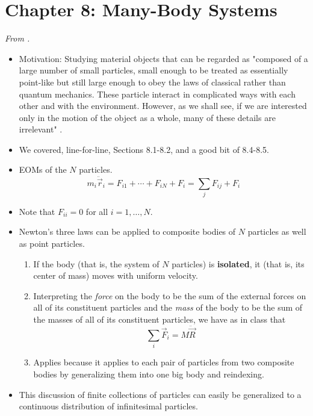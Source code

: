 \documentclass[../notes.tex]{subfiles}
\begin{document}
\section{Chapter 8: Many-Body Systems}
\emph{From \textcite{bib:KibbleBerkshire}.}
\begin{itemize}
    \item {}Motivation: Studying material objects that can be regarded as "composed of a large number of small particles, small enough to be treated as essentially point-like but still large enough to obey the laws of classical rather than quantum mechanics. These particle interact in complicated ways with each other and with the environment. However, as we shall see, if we are interested only in the motion of the object as a whole, many of these details are irrelevant" \parencite[177]{bib:KibbleBerkshire}.
    \item We covered, line-for-line, Sections 8.1-8.2, and a good bit of 8.4-8.5.
    \item {}EOMs of the $N$ particles.
    \begin{equation*}
        m_i\ddot{\vec{r}}_i = F_{i1}+\cdots+F_{iN}+F_i
        = \sum_jF_{ij}+F_i
    \end{equation*}
    \item Note that $F_{ii}=0$ for all $i=1,\dots,N$.
    \item Newton's three laws can be applied to composite bodies of $N$ particles as well as point particles.
    \begin{enumerate}
        \item If the body (that is, the system of $N$ particles) is \textbf{isolated}, it (that is, its center of mass) moves with uniform velocity.
        \item Interpreting the \emph{force} on the body to be the sum of the external forces on all of its constituent particles and the \emph{mass} of the body to be the sum of the masses of all of its constituent particles, we have as in class that
        \begin{equation*}
            \sum_i\vec{F}_i = M\ddot{\vec{R}}
        \end{equation*}
        \item Applies because it applies to each pair of particles from two composite bodies by generalizing them into one big body and reindexing.
    \end{enumerate}
    \item This discussion of finite collections of particles can easily be generalized to a continuous distribution of infinitesimal particles.

\end{itemize}
\end{document}
